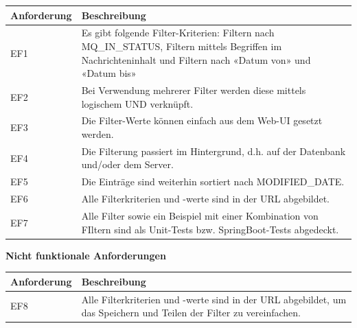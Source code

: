 \noindent \begin{tabular}{|p{3cm}|p{12cm}|}
	\hline
	\textbf{Anforderung}  & \textbf{Beschreibung} \\ \hline
	EF1    & Es gibt folgende Filter-Kriterien: Filtern nach MQ\_IN\_STATUS, Filtern mittels Begriffen im Nachrichteninhalt und Filtern nach «Datum von» und «Datum bis»     \\ \hline
	EF2    & Bei Verwendung mehrerer Filter werden diese mittels logischem UND verknüpft.     \\ \hline
	EF3    & Die Filter-Werte können einfach aus dem Web-UI gesetzt werden.     \\ \hline
	EF4    & Die Filterung passiert im Hintergrund, d.h. auf der Datenbank und/oder dem Server.     \\ \hline
	EF5    & Die Einträge sind weiterhin sortiert nach MODIFIED\_DATE.     \\ \hline
	EF6    & Alle Filterkriterien und -werte sind in der URL abgebildet.     \\ \hline
	EF7    & Alle Filter sowie ein Beispiel mit einer Kombination von FIltern sind als Unit-Tests bzw. SpringBoot-Tests abgedeckt.     \\ \hline
\end{tabular}\newline

\newpage
\noindent \textbf{Nicht funktionale Anforderungen}\newline

\noindent \begin{tabular}{|p{3cm}|p{12cm}|}
	\hline
	\textbf{Anforderung}  & \textbf{Beschreibung} \\ \hline
	EF8    & Alle Filterkriterien und -werte sind in der URL abgebildet, um das Speichern und Teilen der Filter zu vereinfachen.     \\ \hline
\end{tabular}

\newpage